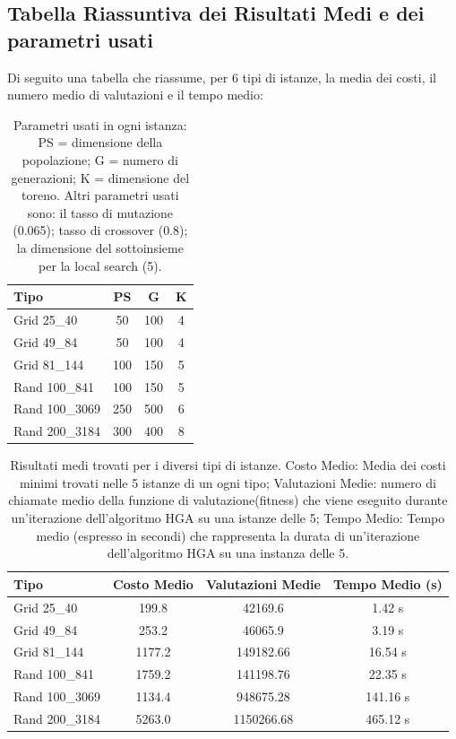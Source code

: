 \documentclass[a4paper,12pt]{article}
\begin{document}
\subsection{Tabella Riassuntiva dei Risultati Medi e dei parametri usati}
Di seguito una tabella che riassume, per 6 tipi di istanze, la media dei costi, il numero medio di valutazioni e il tempo medio:
\begin{table}[H]
    \centering
    \begin{tabular}{lccc}
    \toprule
    Tipo & PS & G & K \\
    \midrule
    Grid 25\_40 & 50 & 100 & 4 \\
    Grid 49\_84 & 50 & 100 & 4 \\
    Grid 81\_144 & 100 & 150 & 5\\
    Rand 100\_841 & 100 & 150 & 5\\
    Rand 100\_3069 & 250 & 500 & 6\\
    Rand 200\_3184 & 300 & 400 & 8\\
    \bottomrule
    \end{tabular}
    \caption{Parametri usati in ogni istanza: PS = dimensione della popolazione; G = numero di generazioni; K = dimensione del toreno. Altri parametri usati sono: il tasso di mutazione (0.065); tasso di crossover (0.8); la dimensione del sottoinsieme per la local search (5).}
    \label{tab:risultati}
\end{table}
\begin{table}[H]
    \centering
    \begin{tabular}{lccc}
    \toprule
    Tipo & Costo Medio & Valutazioni Medie & Tempo Medio (s) \\
    \midrule
    Grid 25\_40    & 199.8 & 42169.6 & 1.42 s \\
    Grid 49\_84    & 253.2 & 46065.9 & 3.19 s \\
    Grid 81\_144   & 1177.2 & 149182.66 & 16.54 s\\
    Rand 100\_841  & 1759.2 & 141198.76 & 22.35 s\\
    Rand 100\_3069 & 1134.4 & 948675.28 & 141.16 s\\
    Rand 200\_3184 & 5263.0 & 1150266.68 & 465.12 s\\
    \bottomrule
    \end{tabular}
    \caption{Risultati medi trovati per i diversi tipi di istanze.
    Costo Medio: Media dei costi minimi trovati nelle 5 istanze di un ogni tipo; Valutazioni Medie: numero di chiamate medio della funzione di valutazione(fitness) che viene eseguito durante un'iterazione dell'algoritmo HGA su una istanze delle 5; Tempo Medio: Tempo medio (espresso in secondi) che rappresenta la durata di un'iterazione dell'algoritmo HGA su una instanza delle 5.}
    \label{tab:risultati}
\end{table}
\end{document}
